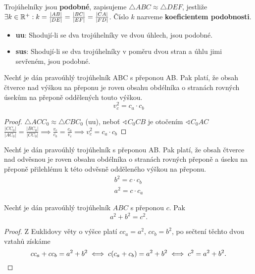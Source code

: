 \begin{definition}
  Trojúhelníky jsou \textbf{podobné}, zapisujeme $\triangle ABC \approx \triangle DEF$, jestliže $\exists k \in \mathbb{R}^+:k = \frac{|AB|}{|DE|}=\frac{|BC|}{|EF|}=\frac{|CA|}{|FD|}$. Číslo $k$ nazveme \textbf{koeficientem podobnosti}.
\end{definition}

\begin{veta}
  \begin{itemize}
    \item \textbf{uu}: Shodují-li se dva trojúhelníky ve dvou úhlech, jsou podobné.
    \item \textbf{sus}: Shodují-li se dva trojúhelníky v poměru dvou stran a úhlu jimi sevřeném, jsou podobné.
  \end{itemize}
\end{veta}

\begin{veta}
  Nechť je dán pravoúhlý trojúhelník ABC s přeponou AB. Pak platí, že obsah čtverce nad výškou na přeponu je roven obsahu obdélníka o stranách rovných úsekům na přeponě oddělených touto výškou.
  $$v_c^2 = c_a \cdot c_b$$
\end{veta}

\begin{proof}
  $\triangle ACC_0 \approx \triangle CBC_0$ (uu), neboť $\sphericalangle C_0 CB$ je otočením $\sphericalangle C_0 AC$
  $\frac{|CC_0|}{|AC_0|} = \frac{|BC_0|}{|CC_0|} \implies \frac{v_c}{c_b} = \frac{c_a}{v_c} \implies v_c^2 = c_a \cdot c_b$
\end{proof}

\begin{veta}
  Nechť je dán pravoúhlý trojúhelník s přeponou AB. Pak platí, že obsah čtverce nad odvěsnou je roven obsahu obdélníka o stranách rovných přeponě a úseku na přeponě přilehlému k této odvěsně odděleného výškou na přeponu.
  \begin{align*}
    b^2 = c \cdot c_b\\
    a^2 = c \cdot c_a
  \end{align*}
\end{veta}

\begin{veta}[Pythagorova]
  Nechť je dán pravoúhlý trojúhelník $ABC$ s přeponou $c$. Pak
  \[
    a^2+b^2 = c^2.
  \]
\end{veta}


\begin{proof}
  Z Euklidovy věty o výšce platí $cc_a=a^2$, $cc_b=b^2$, po sečtení těchto dvou vztahů získáme
  \[
    cc_a+cc_b=a^2+b^2 \iff c(c_a+c_b)=a^2+b^2 \iff c^2=a^2+b^2. \qedhere
  \]
\end{proof}

